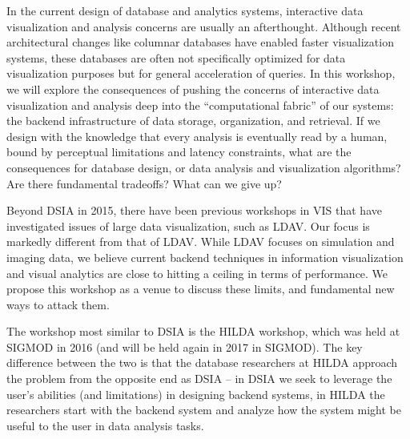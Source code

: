 \documentclass[journal]{vgtc}                %
\begin{document}
In the current design of database and analytics systems, interactive data visualization and analysis concerns are usually an afterthought. 
Although recent architectural changes like columnar databases have enabled faster visualization systems, these databases are often not specifically optimized for data visualization purposes but for general acceleration of queries. 
In this workshop, we will explore the consequences of pushing the concerns of interactive data visualization and analysis deep into the ``computational fabric'' of our systems: the backend infrastructure of data storage, organization, and retrieval. 
If we design with the knowledge that every analysis is eventually read by a human, bound by perceptual limitations and latency constraints, what are the consequences for database design, or data analysis and visualization algorithms? 
Are there fundamental tradeoffs? 
What can we give up?

Beyond DSIA in 2015, there have been previous workshops in VIS that have investigated issues of large data visualization, such as LDAV. 
Our focus is markedly different from that of LDAV. 
While LDAV focuses on simulation and imaging data, we believe current backend techniques in information visualization and visual analytics are close to hitting a ceiling in terms of performance. 
We propose this workshop as a venue to discuss these limits, and fundamental new ways to attack them.

The workshop most similar to DSIA is the HILDA workshop, which was held at SIGMOD in 2016 (and will be held again in 2017 in SIGMOD). 
The key difference between the two is that the database researchers at HILDA approach the problem from the opposite end as DSIA -- in DSIA we seek to leverage the user's abilities (and limitations) in designing backend systems, in HILDA the researchers start with the backend system and analyze how the system might be useful to the user in data analysis tasks.
\end{document}
